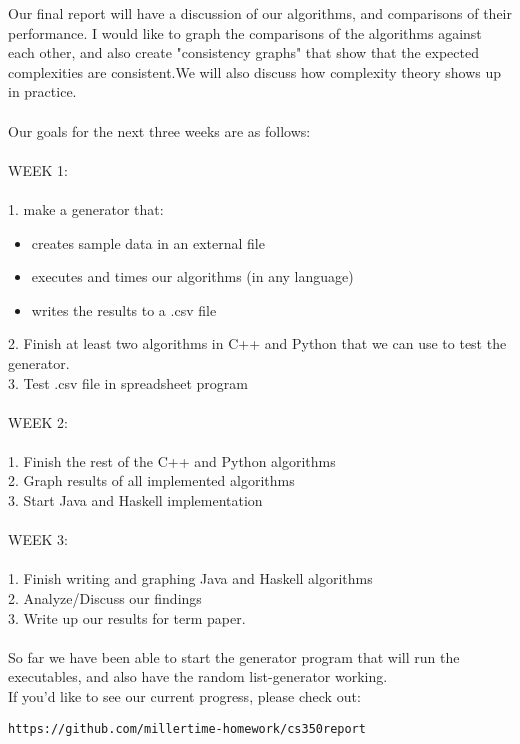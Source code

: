 \documentclass[12pt]{amsart}
\begin{document}
Our final report will have a discussion of our algorithms, and comparisons of their performance. I would like to 
graph the comparisons of the algorithms against each other, and also create "consistency graphs" that show that
the expected complexities are consistent.We will also discuss how complexity theory shows up in practice.\\ \\
Our goals for the next three weeks are as follows:\\ \\
WEEK 1:\\ \\
1. make a generator that:
\begin{itemize}
\item creates sample data in an external file
\item executes and times our algorithms (in any language)
\item writes the results to a .csv file\\
\end{itemize}
2. Finish at least two algorithms in C++ and Python that we can use to test the generator. \\
3. Test .csv file in spreadsheet program\\ \\
WEEK 2:\\ \\
1. Finish the rest of the C++ and Python algorithms\\ 
2. Graph results of all implemented algorithms\\
3. Start Java and Haskell implementation\\ \\
WEEK 3:\\ \\
1. Finish writing and graphing Java and Haskell algorithms\\
2. Analyze/Discuss our findings\\
3. Write up our results for term paper.\\
\\
So far we have been able to start the generator program that will run the executables, and also
have the random list-generator working.\\
If you'd like to see our current progress, 
please check out: 
\begin{verbatim}
https://github.com/millertime-homework/cs350report
\end{verbatim}
\end{document}
